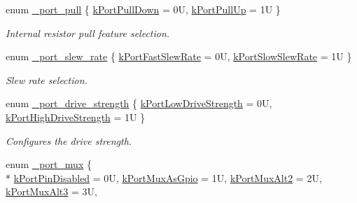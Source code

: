 \begin{DoxyCompactItemize}
\item 
enum \hyperlink{group__port__hal_gac523311af56d02fec0355dd272607d2d}{\+\_\+port\+\_\+pull} \{ \hyperlink{group__port__hal_ggac523311af56d02fec0355dd272607d2dacf209c981f7b4309847f8de5990b60b8}{k\+Port\+Pull\+Down} = 0U, 
\hyperlink{group__port__hal_ggac523311af56d02fec0355dd272607d2daa1fd79c30d04eec4c29eaa8e18ce4ecd}{k\+Port\+Pull\+Up} = 1U
 \}\begin{DoxyCompactList}\small\item\em Internal resistor pull feature selection. \end{DoxyCompactList}
\item 
enum \hyperlink{group__port__hal_ga39dfc59254a6c31e31aed71de831b6a2}{\+\_\+port\+\_\+slew\+\_\+rate} \{ \hyperlink{group__port__hal_gga39dfc59254a6c31e31aed71de831b6a2a2176a198865695170da233394740a014}{k\+Port\+Fast\+Slew\+Rate} = 0U, 
\hyperlink{group__port__hal_gga39dfc59254a6c31e31aed71de831b6a2a16fcdaaf75f46536bbab30fd1ff51349}{k\+Port\+Slow\+Slew\+Rate} = 1U
 \}\begin{DoxyCompactList}\small\item\em Slew rate selection. \end{DoxyCompactList}
\item 
enum \hyperlink{group__port__hal_ga17fdac515979a1b6cefc0135add46f42}{\+\_\+port\+\_\+drive\+\_\+strength} \{ \hyperlink{group__port__hal_gga17fdac515979a1b6cefc0135add46f42a9593bfe51d1f43d06a93c45b21ddacb6}{k\+Port\+Low\+Drive\+Strength} = 0U, 
\hyperlink{group__port__hal_gga17fdac515979a1b6cefc0135add46f42ad3fd42a5fe72ba226796cfffb7728fb9}{k\+Port\+High\+Drive\+Strength} = 1U
 \}\begin{DoxyCompactList}\small\item\em Configures the drive strength. \end{DoxyCompactList}
\item 
enum \hyperlink{group__port__hal_gac926cac9eed74e607a4034ce1e210cb7}{\+\_\+port\+\_\+mux} \{ \\*
\hyperlink{group__port__hal_ggac926cac9eed74e607a4034ce1e210cb7a59a5f8dd8bc06812ae126c9f9192055d}{k\+Port\+Pin\+Disabled} = 0U, 
\hyperlink{group__port__hal_ggac926cac9eed74e607a4034ce1e210cb7afee101f670bf9680112f0ccc5dd6edbc}{k\+Port\+Mux\+As\+Gpio} = 1U, 
\hyperlink{group__port__hal_ggac926cac9eed74e607a4034ce1e210cb7a517b0c1f678068768d4c7b4d8baa34cd}{k\+Port\+Mux\+Alt2} = 2U, 
\hyperlink{group__port__hal_ggac926cac9eed74e607a4034ce1e210cb7a7e092cd69bcf8ddf135401e7ad861eb6}{k\+Port\+Mux\+Alt3} = 3U, 

\end{DoxyCompactItemize}
